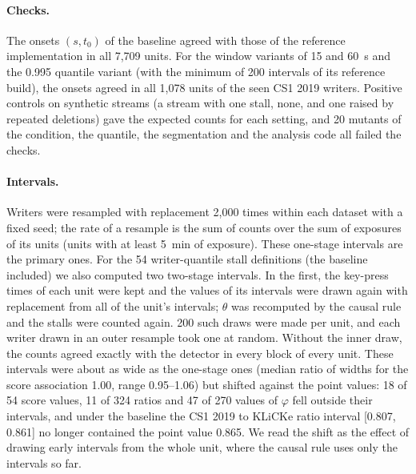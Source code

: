 \paragraph{Checks.} The onsets $(s, t_0)$ of the baseline agreed with those of the reference implementation in all
7,709 units. For the window variants of 15 and 60~s and the 0.995 quantile variant (with the minimum of 200 intervals of
its reference build), the onsets agreed in all 1,078 units of the seen CS1 2019 writers. Positive controls on synthetic
streams (a stream with one stall, none, and one raised by repeated deletions) gave the expected counts for each
setting, and 20 mutants of the condition, the quantile, the segmentation and the analysis code all failed the checks.

\paragraph{Intervals.} Writers were resampled with replacement 2,000 times within each dataset with a fixed seed; the
rate of a resample is the sum of counts over the sum of exposures of its units (units with at least 5~min of
exposure). These one-stage intervals are the primary ones. For the 54 writer-quantile stall definitions (the baseline included) we also
computed two two-stage intervals. In the first, the key-press times of each unit were kept and the values of its
intervals were drawn again with replacement from all of the unit's intervals; $\theta$ was recomputed by the causal
rule and the stalls were counted again. 200 such draws were made per unit, and each writer drawn in an outer resample
took one at random. Without the inner draw, the counts agreed exactly with the detector in every block of every unit.
These intervals were about as wide as the one-stage ones (median ratio of widths for the score association 1.00, range
0.95--1.06) but shifted against the point values: 18 of 54 score values, 11 of 324 ratios and 47 of 270 values of
$\varphi$ fell outside their intervals, and under the baseline the CS1 2019 to KLiCKe ratio interval [0.807, 0.861] no
longer contained the point value 0.865. We read the shift as the effect of drawing early intervals from the whole unit,
where the causal rule uses only the intervals so far.

